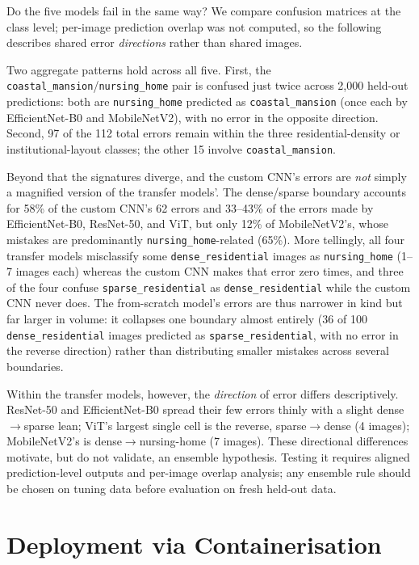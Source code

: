 \documentclass[11pt,twoside,a4paper]{article}
\begin{document}
Do the five models fail in the same way? We compare confusion matrices at the
class level; per-image prediction overlap was not computed, so the following
describes shared error \emph{directions} rather than shared images.

Two aggregate patterns hold across all five. First, the
\texttt{coastal\_mansion}/\texttt{nursing\_home} pair is confused just twice
across 2,000 held-out predictions: both are \texttt{nursing\_home} predicted as
\texttt{coastal\_mansion} (once each by EfficientNet-B0 and MobileNetV2), with
no error in the opposite direction. Second, 97 of the 112 total errors remain
within the three residential-density or institutional-layout classes; the
other 15 involve \texttt{coastal\_mansion}.

Beyond that the signatures diverge, and the custom CNN's errors are
\emph{not} simply a magnified version of the transfer models'. The
dense/sparse boundary accounts for 58\% of the custom CNN's 62 errors and
33--43\% of the errors made by EfficientNet-B0, ResNet-50, and ViT, but only
12\% of MobileNetV2's, whose mistakes are predominantly
\texttt{nursing\_home}-related (65\%). More tellingly, all four transfer
models misclassify some \texttt{dense\_residential} images as
\texttt{nursing\_home} (1--7 images each) whereas the custom CNN makes that
error zero times, and three of the four confuse
\texttt{sparse\_residential} as \texttt{dense\_residential} while the custom
CNN never does. The from-scratch model's errors are thus narrower in kind but
far larger in volume: it collapses one boundary almost entirely (36 of 100
\texttt{dense\_residential} images predicted as \texttt{sparse\_residential},
with no error in the reverse direction) rather than distributing smaller
mistakes across several boundaries.

Within the transfer models, however, the \emph{direction} of error differs
descriptively. ResNet-50 and EfficientNet-B0 spread their few errors thinly
with a slight dense$\rightarrow$sparse lean; ViT's largest single cell is the
reverse, sparse$\rightarrow$dense (4 images); MobileNetV2's is
dense$\rightarrow$nursing-home (7 images). These directional differences
motivate, but do not validate, an ensemble hypothesis. Testing it requires
aligned prediction-level outputs and per-image overlap analysis; any ensemble
rule should be chosen on tuning data before evaluation on fresh held-out data.

\section{Deployment via Containerisation}
\label{sec:deployment}
\end{document}

